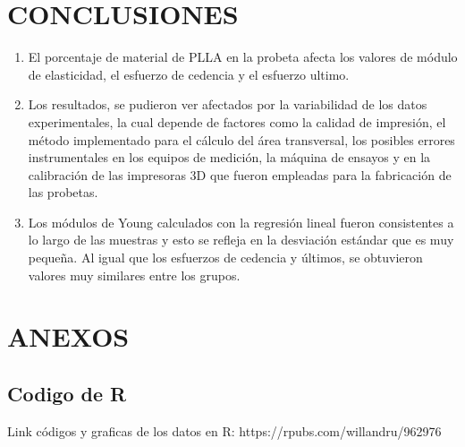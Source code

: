 \documentclass[journal,transmag]{IEEEtran}
\begin{document}
   \section{CONCLUSIONES}
 
 	\begin{enumerate}
 
  \item El porcentaje de material de PLLA en la probeta afecta los valores de módulo de elasticidad, el esfuerzo de cedencia y el esfuerzo ultimo.  
   \item Los resultados, se pudieron ver afectados por la variabilidad de los datos experimentales, la cual depende de factores como la calidad de impresión, el método implementado para el cálculo del área transversal, los posibles errores instrumentales en los equipos de medición, la máquina de ensayos y en la calibración de las impresoras 3D que fueron empleadas para la fabricación de las probetas. 
    \item Los módulos de Young calculados con la regresión lineal fueron consistentes a lo largo de las muestras y esto se refleja en la desviación estándar que es muy pequeña. Al igual que los esfuerzos de cedencia y últimos, se obtuvieron valores muy similares entre los grupos. 
    
    	\end{enumerate}

\section{ANEXOS}

\subsection{Codigo de R}
    Link códigos y graficas de los datos en R: https://rpubs.com/willandru/962976 

\ifCLASSOPTIONcaptionsoff
  \newpage
\fi
\end{document}
